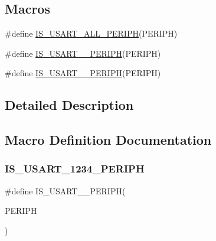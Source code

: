 \subsection*{Macros}
\begin{DoxyCompactItemize}
\item 
\#define \mbox{\hyperlink{group___u_s_a_r_t___exported___constants_gae890b8e77c1b84a77c485a353949f7eb}{I\+S\+\_\+\+U\+S\+A\+R\+T\+\_\+\+A\+L\+L\+\_\+\+P\+E\+R\+I\+PH}}(P\+E\+R\+I\+PH)
\item 
\#define \mbox{\hyperlink{group___u_s_a_r_t___exported___constants_ga30e128c5edde23e1315724c0b2000d0d}{I\+S\+\_\+\+U\+S\+A\+R\+T\+\_\+\_\+\+P\+E\+R\+I\+PH}}(P\+E\+R\+I\+PH)
\item 
\#define \mbox{\hyperlink{group___u_s_a_r_t___exported___constants_ga9b6af380cae2290d0653bd555deaeda1}{I\+S\+\_\+\+U\+S\+A\+R\+T\+\_\+\_\+\+P\+E\+R\+I\+PH}}(P\+E\+R\+I\+PH)
\end{DoxyCompactItemize}


\subsection{Detailed Description}


\subsection{Macro Definition Documentation}
\mbox{\label{group___u_s_a_r_t___exported___constants_ga9b6af380cae2290d0653bd555deaeda1}} 
\subsubsection{\texorpdfstring{IS\_USART\_1234\_PERIPH}{IS\_USART\_1234\_PERIPH}}
{\footnotesize\ttfamily \#define I\+S\+\_\+\+U\+S\+A\+R\+T\+\_\+\_\+\+P\+E\+R\+I\+PH(\begin{DoxyParamCaption}\item[{}]{P\+E\+R\+I\+PH }\end{DoxyParamCaption})}

